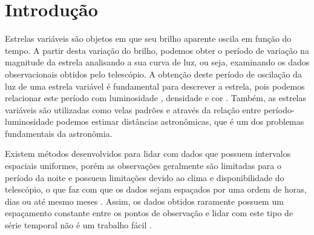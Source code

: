 \chapter{Introdu\c{c}ão}



Estrelas variáveis são objetos em que seu brilho aparente oscila em função do tempo. A partir desta variação do brilho, podemos obter o período de variação na magnitude da estrela analisando a sua curva de luz, ou seja, examinando os dados observacionais obtidos pelo telescópio. A obtenção deste período de oscilação da luz de uma estrela variável é fundamental para descrever a estrela, pois podemos relacionar este período com luminosidade \citep{Leavitt1912}, densidade \citep{Payne1930} e cor \citep{Kraft1960}. Também, as estrelas variáveis são utilizadas como velas padrões e através da relação entre período-luminosidade podemos estimar distâncias astronômicas, que é um dos problemas fundamentais da astronômia.

Existem métodos desenvolvidos para lidar com dados que possuem intervalos espaciais uniformes, porém as observações geralmente são limitadas para o período da noite e possuem limitações devido ao clima e disponibilidade do telescópio, o que faz com que os dados sejam espaçados por uma ordem de horas, dias ou até mesmo meses \citep{mello81}.
Assim, os dados obtidos raramente possuem um espaçamento constante entre os pontos de observação e lidar com este tipo de série temporal não é um trabalho fácil \citep{lomb}.







